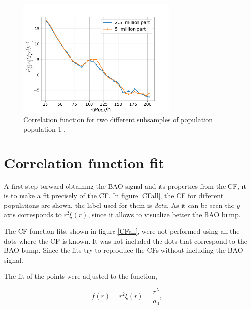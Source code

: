 \begin{figure}[htbp]
       \centering
               \includegraphics[width=0.7\textwidth]{Images/chapter4/CF_1e11_NofP.pdf}
       \caption{\small Correlation function for two different subsamples of population 
       population 1 .}
       \label{NofP}
 \end{figure}



\section{ Correlation function fit }

A first step torward obtaining the BAO signal and its properties from the CF,
it is to make a fit precisely of the CF. In figure \ref{CFall}, the CF 
for different populations are shown, the label used for them is \textit{data}. 
As it can be seen the $y$ axis corresponds to $r^2\xi(r)$, since it allows to visualize better the BAO bump.

The CF function fits, shown in figure \ref{CFall}, were not performed using
all the dots where the CF is known. It was not included the dots that
correspond to the BAO bump. Since the fits try to reproduce the CFs
without including the BAO signal. 

The fit of the points were adjusted to the function, 

\begin{equation}
f(r) = r^2\xi(r) = \frac{r^\lambda}{a_0},
\label{CF_r2}
\end{equation}


